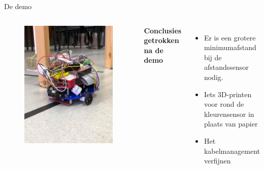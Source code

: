 \documentclass[aspectratio=169,kulak,t,handout]{kulakbeamer} %
\begin{document}
\begin{frame}{\Large De demo}
	\begin{columns}
		\centering
		
		\begin{figure}
			\centering
			\includegraphics[width=.5\textwidth]{demo}
			
			\label{fig:Demo}
		\end{figure}
		\centering
		{\bf{Conclusies getrokken na de demo}}\\[.2cm]
		
		\begin{itemize}
			\large\item Er is een grotere minimumafstand bij de afstandssensor nodig.
			\item Iets 3D-printen voor rond de kleurensensor in plaats van papier
			\item Het kabelmanagement verfijnen
		\end{itemize}
		
	\end{columns}
	
	
\end{frame}
\end{document}
